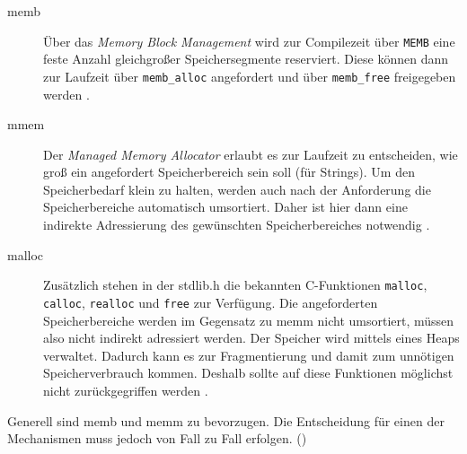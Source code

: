 	\begin{description}
	\item[memb]
		Über das \emph{Memory Block Management} wird zur Compilezeit
		über \lstinline=MEMB= eine feste Anzahl gleichgroßer
		Speichersegmente reserviert.  Diese können dann zur Laufzeit
		über \lstinline=memb_alloc= angefordert und über \lstinline=memb_free= freigegeben werden
		\parencite[siehe][Memory block management functions]{Contiki:Doc}.
	\item[mmem]
		Der \emph{Managed Memory Allocator} erlaubt es zur Laufzeit
		zu entscheiden, wie groß ein angefordert Speicherbereich sein soll (\zB für Strings).
		Um den Speicherbedarf klein zu halten, werden auch nach der
		Anforderung die Speicherbereiche automatisch umsortiert.
		Daher ist hier dann eine indirekte Adressierung des gewünschten
		Speicherbereiches notwendig
		\parencite[siehe][Managed memory allocator]{Contiki:Doc}.
	\item[malloc]
		Zusätzlich stehen in der stdlib.h die bekannten C-Funktionen
			\lstinline=malloc=,
			\lstinline=calloc=,
			\lstinline=realloc= und
			\lstinline=free=
		zur Verfügung.  Die angeforderten Speicherbereiche werden im
		Gegensatz zu memm nicht umsortiert, müssen also nicht indirekt
		adressiert werden.  Der Speicher wird mittels eines Heaps
		verwaltet.  Dadurch kann es zur Fragmentierung und damit zum
		unnötigen Speicherverbrauch kommen.  Deshalb sollte auf diese
		Funktionen möglichst nicht zurückgegriffen werden
		\autocite{ContikiWiki:malloc}.
	\end{description}

	Generell sind memb und memm zu bevorzugen.  Die Entscheidung für einen
	der Mechanismen muss jedoch von Fall zu Fall erfolgen.
	()
	
